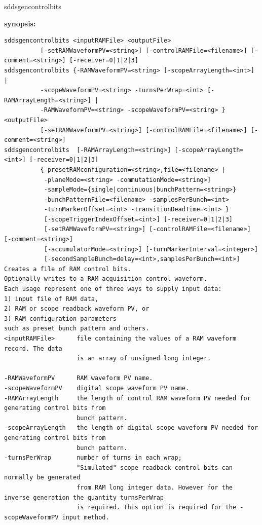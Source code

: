\begin{sddsprog}{sddsgencontrolbits}
\item {\bf synopsis:} 
\small
\begin{verbatim}
sddsgencontrolbits <inputRAMFile> <outputFile>
          [-setRAMWaveformPV=<string>] [-controlRAMFile=<filename>] [-comment=<string>] [-receiver=0|1|2|3]
sddsgencontrolbits {-RAMWaveformPV=<string> [-scopeArrayLength=<int>] |
          -scopeWaveformPV=<string> -turnsPerWrap=<int> [-RAMArrayLength=<string>] |
          -RAMWaveformPV=<string> -scopeWaveformPV=<string> } <outputFile>
          [-setRAMWaveformPV=<string>] [-controlRAMFile=<filename>] [-comment=<string>]
sddsgencontrolbits  [-RAMArrayLength=<string>] [-scopeArrayLength=<int>] [-receiver=0|1|2|3]
          {-presetRAMconfiguration=<string>,file=<filename> |
           -planeMode=<string> -commutationMode=<string>]
           -sampleMode={single|continuous|bunchPattern=<string>}
           -bunchPatternFile=<filename> -samplesPerBunch=<int>
           -turnMarkerOffset=<int> -transitionDeadTime=<int> }
           [-scopeTriggerIndexOffset=<int>] [-receiver=0|1|2|3]
           [-setRAMWaveformPV=<string>] [-controlRAMFile=<filename>] [-comment=<string>]
           [-accumulatorMode=<string>] [-turnMarkerInterval=<integer>]
           [-secondSampleBunch=delay=<int>,samplesPerBunch=<int>]
Creates a file of RAM control bits.
Optionally writes to a RAM acquisition control waveform.
Each usage represent one of three ways to supply input data:
1) input file of RAM data,
2) RAM or scope readback waveform PV, or
3) RAM configuration parameters 
such as preset bunch pattern and others.
<inputRAMFile>      file containing the values of a RAM waveform record. The data 
                    is an array of unsigned long integer.

-RAMWaveformPV      RAM waveform PV name. 
-scopeWaveformPV    digital scope waveform PV name. 
-RAMArrayLength     the length of control RAM waveform PV needed for generating control bits from 
                    bunch pattern.
-scopeArrayLength   the length of digital scope waveform PV needed for generating control bits from 
                    bunch pattern.
-turnsPerWrap       number of turns in each wrap; 
                    "Simulated" scope readback control bits can normally be generated 
                    from RAM long integer data. However for the inverse generation the quantity turnsPerWrap 
                    is required. This option is required for the -scopeWaveformPV input method.


\end{verbatim}
\end{sddsprog}
